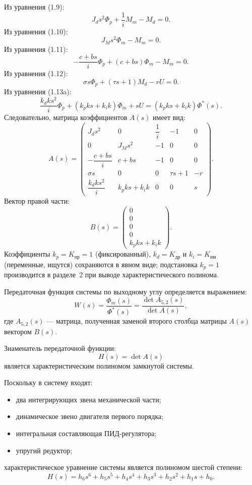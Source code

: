 \documentclass[a4paper, 14pt]{extarticle}
\begin{document}
Из уравнения (1.9):
\[
    J_d s^2\Phi_p + \frac{1}{i}M_m - M_d = 0.
\]
Из уравнения (1.10):
\[
    J_M s^2\Phi_m - M_m = 0.
\]
Из уравнения (1.11):
\[
    -\frac{c+bs}{i}\Phi_p + (c+bs)\Phi_m - M_m = 0.
\]
Из уравнения (1.12):
\[
    \sigma s\Phi_p + (\tau s+1)M_d - rU = 0.
\]
Из уравнения (1.13a):
\[
    \frac{k_d k s^2}{i}\Phi_p
    +
    (k_p k s + k_i k)\Phi_m
    +
    sU
    =
    (k_p k s + k_i k)\Phi^*(s).
\]
Следовательно, матрица коэффициентов \(A(s)\) имеет вид:
\[
    A(s)=
    \begin{pmatrix}
        J_d s^2              & 0               & \dfrac{1}{i} & -1       & 0  \\[3mm]
        0                    & J_M s^2         & -1           & 0        & 0  \\[3mm]
        -\dfrac{c+bs}{i}     & c+bs            & -1           & 0        & 0  \\[3mm]
        \sigma s             & 0               & 0            & \tau s+1 & -r \\[3mm]
        \dfrac{k_d k s^2}{i} & k_p k s + k_i k & 0            & 0        & s
    \end{pmatrix}.
\]
Вектор правой части:
\[
    B(s)=
    \begin{pmatrix}
        0 \\ 0 \\ 0 \\ 0 \\ k_p k s + k_i k
    \end{pmatrix}.
\]
Коэффициенты $k_p = K_{\text{пр}} = 1$ (фиксированный),
$k_d = K_{\text{др}}$ и $k_i = K_{\text{им}}$ (переменные, ищутся)
сохраняются в явном виде; подстановка $k_p=1$
производится в разделе~2 при выводе характеристического полинома.

Передаточная функция системы по выходному углу определяется выражением:
\[
    W(s)=
    \frac{\Phi_m(s)}{\Phi^*(s)}
    =
    \frac{\det A_{5,2}(s)}
    {\det A(s)},
\]
где \(A_{5,2}(s)\) — матрица, полученная заменой второго столбца матрицы \(A(s)\) вектором \(B(s)\).

Знаменатель передаточной функции:
\[
    H(s)=\det A(s)
\]
является характеристическим полиномом замкнутой системы.

Поскольку в систему входят:
\begin{itemize}
    \item два интегрирующих звена механической части;
    \item динамическое звено двигателя первого порядка;
    \item интегральная составляющая ПИД-регулятора;
    \item упругий редуктор;
\end{itemize}
характеристическое уравнение системы
является полиномом шестой степени:
\[
    H(s)=
    h_6 s^6+
    h_5 s^5+
    h_4 s^4+
    h_3 s^3+
    h_2 s^2+
    h_1 s+
    h_0.
\]
\end{document}
